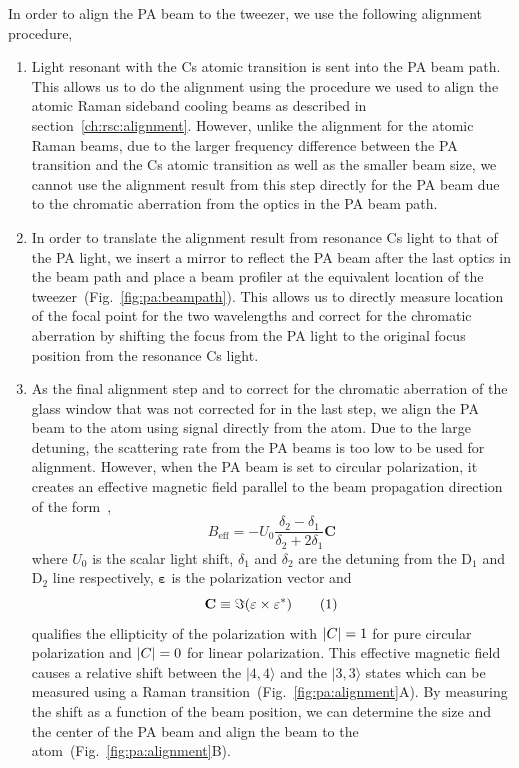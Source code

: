 In order to align the PA beam to the tweezer, we use the following alignment procedure,
\begin{enumerate}
\item Light resonant with the Cs atomic transition is sent into the PA beam path.
  This allows us to do the alignment using the procedure we used to align the
  atomic Raman sideband cooling beams as described in section~\ref{ch:rsc:alignment}.
  However, unlike the alignment for the atomic Raman beams,
  due to the larger frequency difference between the PA transition and the Cs atomic
  transition as well as the smaller beam size,
  we cannot use the alignment result from this step directly for the PA beam
  due to the chromatic aberration from the optics in the PA beam path.
\item In order to translate the alignment result from resonance Cs light to that of the PA light,
  we insert a mirror to reflect the PA beam after the last optics in the beam path
  and place a beam profiler at the equivalent location of
  the tweezer~(Fig.~\ref{fig:pa:beampath}).
  This allows us to directly measure location of the focal point for the two wavelengths
  and correct for the chromatic aberration by shifting the focus from the PA light
  to the original focus position from the resonance Cs light.
\item As the final alignment step and to correct for the chromatic aberration of the
  glass window that was not corrected for in the last step,
  we align the PA beam to the atom using signal directly from the atom.
  Due to the large detuning, the scattering rate from the PA beams
  is too low to be used for alignment.
  However, when the PA beam is set to circular polarization, it creates an effective
  magnetic field parallel to the beam propagation direction
  of the form~\cite{thompson_coherence_2013},
  \[ B_{\mathrm{eff}}=-U_0\frac{\delta_2-\delta_1}{\delta_2+2\delta_1}\mathbf{C} \]
  where $U_0$ is the scalar light shift, $\delta_1$ and $\delta_2$ are the detuning from the
  $\mathrm{D}_1$ and $\mathrm{D}_2$ line respectively,
  $\mathbf{\varepsilon}$ is the polarization vector and
  \[\mathbf{C}\equiv\Im\paren{\mathbf{\varepsilon}\times\mathbf{\varepsilon}^*}
    \numberthis{eq:pa:beampath:def-c}\]
  qualifies the ellipticity of the polarization with
  ${\left|{C}\right|}=1$ for pure circular polarization and ${\left|{C}\right|}=0$ for linear polarization.
  This effective magnetic field causes a relative shift between the $|4,4\rangle$
  and the $|3,3\rangle$ states which can be measured using
  a Raman transition~(Fig.~\ref{fig:pa:alignment}A).
  By measuring the shift as a function of the beam position,
  we can determine the size and the center of the PA beam and align the beam to
  the atom~(Fig.~\ref{fig:pa:alignment}B).
\end{enumerate}

